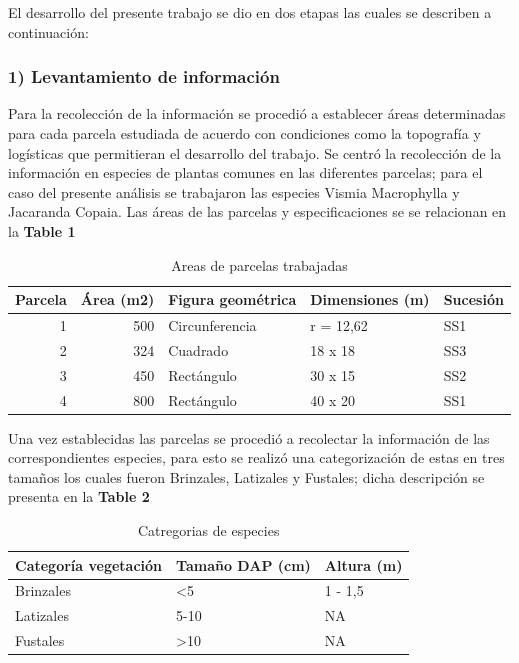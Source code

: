 \documentclass[letterpaper,9pt,onecolumn,twoside,]{pinp}
\begin{document}
El desarrollo del presente trabajo se dio en dos etapas las cuales se
describen a continuación:

\hypertarget{levantamiento-de-informaciuxf3n}{%
\subsubsection{1) Levantamiento de
información}\label{levantamiento-de-informaciuxf3n}}

Para la recolección de la información se procedió a establecer áreas
determinadas para cada parcela estudiada de acuerdo con condiciones como
la topografía y logísticas que permitieran el desarrollo del trabajo. Se
centró la recolección de la información en especies de plantas comunes
en las diferentes parcelas; para el caso del presente análisis se
trabajaron las especies Vismia Macrophylla y Jacaranda Copaia. Las áreas
de las parcelas y especificaciones se se relacionan en la \textbf{Table
1}

\begin{table}[h]

\caption{\label{tab:unnamed-chunk-1}Areas de parcelas trabajadas}
\centering
\begin{tabular}[t]{r|r|l|l|l}
\hline
Parcela & Área (m2) & Figura geométrica & Dimensiones (m) & Sucesión\\
\hline
1 & 500 & Circunferencia & r = 12,62 & SS1\\
\hline
2 & 324 & Cuadrado & 18 x 18 & SS3\\
\hline
3 & 450 & Rectángulo & 30 x 15 & SS2\\
\hline
4 & 800 & Rectángulo & 40 x 20 & SS1\\
\hline
\end{tabular}
\end{table}

Una vez establecidas las parcelas se procedió a recolectar la
información de las correspondientes especies, para esto se realizó una
categorización de estas en tres tamaños
los cuales fueron Brinzales, Latizales y Fustales; dicha descripción se
presenta en la \textbf{Table 2}

\begin{table}

\caption{\label{tab:unnamed-chunk-2}Catregorias de especies}
\centering
\begin{tabular}[t]{l|l|l}
\hline
Categoría vegetación & Tamaño DAP (cm) & Altura (m)\\
\hline
Brinzales & <5 & 1 - 1,5\\
\hline
Latizales & 5-10 & NA\\
\hline
Fustales & >10 & NA\\
\hline
\end{tabular}
\end{table}
\end{document}

